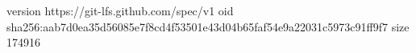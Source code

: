 version https://git-lfs.github.com/spec/v1
oid sha256:aab7d0ea35d56085e7f8cd4f53501e43d04b65faf54e9a22031c5973c91ff9f7
size 174916
